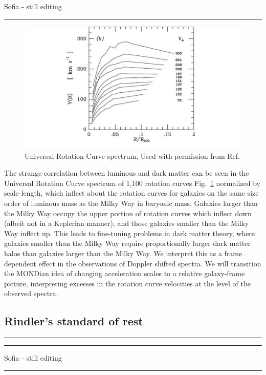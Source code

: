 \documentclass[reprint,%
 amsmath,amssymb,
 aps,
]{revtex4-1}
\begin{document}
 {\color{teal}Sofia - still editing}
 {\color{teal} \rule{\linewidth}{0.5mm}}
 
\begin{figure}[h!]
     \centering
     \includegraphics[width=\linewidth]{URC}
     \caption{Universal Rotation Curve spectrum, Used with permission from Ref.\citep{salucci}}
     \label{fig:URC}
\end{figure}
The strange correlation between luminous and  dark matter  can be seen in the Universal Rotation Curve spectrum of 1,100 rotation curves Fig.~\ref{fig:URC} normalized by scale-length, which inflect about the rotation curves for galaxies on the same size order of luminous mass as  the Milky Way in baryonic mass. Galaxies larger than the Milky Way occupy the upper portion of rotation curves which inflect down (albeit not in a Keplerian manner), and those galaxies smaller than the Milky Way inflect up.  This leads to fine-tuning problems in  dark matter theory, where
   galaxies smaller than the Milky Way require proportionally larger  dark matter halos than      galaxies larger than the Milky Way.   We interpret this as a frame dependent effect in the observations of Doppler shifted spectra. We will   transition the MONDian idea of changing acceleration scales  to a relative galaxy-frame picture, interpreting excesses in the rotation curve velocities at the level of the observed spectra. 
 

 \subsection{Rindler's standard of rest}
 {\color{teal} \rule{\linewidth}{0.5mm}}
 
{\color{teal} \rule{\linewidth}{0.5mm}}
 
 {\color{teal}Sofia - still editing}
 {\color{teal} \rule{\linewidth}{0.5mm}}
 
\end{document}
